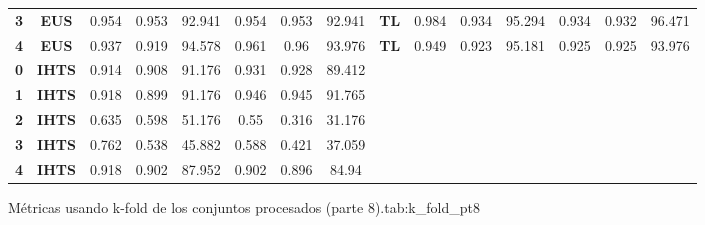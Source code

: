 {{\begin{tabular}{c|c|cccccc|ccccccc}
\textbf{3} & \textbf{EUS} & 0.954 & 0.953 & 92.941 & 0.954 & 0.953 & 92.941 & \multicolumn{1}{c|}{\textbf{TL}} & 0.984 & 0.934 & 95.294 & 0.934 & 0.932 & 96.471 \\
\textbf{4} & \textbf{EUS} & 0.937 & 0.919 & 94.578 & 0.961 & 0.96  & 93.976 & \multicolumn{1}{c|}{\textbf{TL}} & 0.949 & 0.923 & 95.181 & 0.925 & 0.925 & 93.976 \\
\textbf{0} & \textbf{IHTS} & 0.914 & 0.908 & 91.176 & 0.931 & 0.928 & 89.412 &       &       &       &       &       &       &  \\
\textbf{1} & \textbf{IHTS} & 0.918 & 0.899 & 91.176 & 0.946 & 0.945 & 91.765 &       &       &       &       &       &       &  \\
\textbf{2} & \textbf{IHTS} & 0.635 & 0.598 & 51.176 & 0.55  & 0.316 & 31.176 &       &       &       &       &       &       &  \\
\textbf{3} & \textbf{IHTS} & 0.762 & 0.538 & 45.882 & 0.588 & 0.421 & 37.059 &       &       &       &       &       &       &  \\
\textbf{4} & \textbf{IHTS} & 0.918 & 0.902 & 87.952 & 0.902 & 0.896 & 84.94 &       &       &       &       &       &       &  \\
\end{tabular}}}{Métricas usando k-fold de los conjuntos procesados (parte 8).}{tab:k_fold_pt8}

